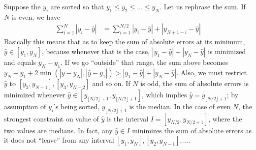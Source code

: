 \documentclass[10pt]{article}
\begin{document}
\begin{itemize}
 \color{black}
 Suppose the $y_i$ are sorted so that $y_1 \leq y_2 \leq \dots \leq y_N$. Let us rephrase the sum. If $N$ is even, we have
 \begin{align*}
 \sum_{i = 1}^N |y_i - \hat{y}| &= \sum_{i = 1}^{N / 2} |y_i - \hat{y}| + |y_{N + 1 - i} - \hat{y}|
 \end{align*}
 Basically this means that as to keep the sum of absolute errors at its minimum, $\hat{y} \in [y_1, y_N]$, because whenever that is the case, $|y_1 - \hat{y}| + |y_N - \hat{y}|$ is minimized and equals $y_N - y_1$. If we go ``outside'' that range, the sum above becomes $y_N - y_1 + 2\min(|\hat{y} - y_N|, |\hat{y} - y_1|) > |y_1 - \hat{y}| + |y_N - \hat{y}|$. Also, we must restrict $\hat{y}$ to $[y_2, y_{N - 1}], [y_3, y_{N -2}]$ and so on. If $N$ is odd, the sum of absolute errors is minimized whenever $\hat{y} \in [y_{\lfloor N / 2 \rfloor + 1}, y_{\lfloor N / 2 \rfloor + 1}]$, which implies $\hat{y} = y_{\lfloor N / 2 \rfloor + 1}$; by assumption of $y_i$'s being sorted, $y_{\lfloor N / 2 \rfloor + 1}$ is the median. In the case of even $N$, the strongest constraint on value of $\hat{y}$ is the interval $I = [y_{N / 2}, y_{N / 2 + 1}]$, where the two values are medians. In fact, any $\hat{y} \in I$ minimizes the sum of absolute errors as it does not ``leave'' from any interval $[y_1, y_N], [y_2, y_{N - 1}], \dots$.
\end{itemize}

\color{blue}
\end{document}
